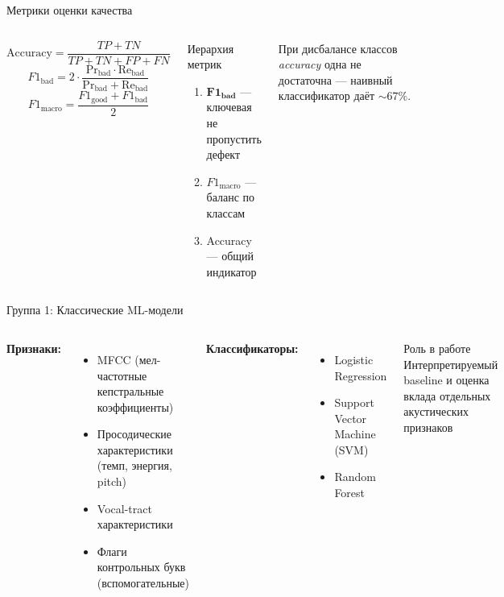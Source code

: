 \documentclass[aspectratio=169]{beamer}
\begin{document}
\begin{frame}{Метрики оценки качества}
  \begin{columns}[T]
      \[
        \text{Accuracy} = \frac{TP + TN}{TP + TN + FP + FN}
      \]
      \[
        F1_{\text{bad}} = 2 \cdot \frac{\text{Pr}_{\text{bad}} \cdot \text{Re}_{\text{bad}}}{\text{Pr}_{\text{bad}} + \text{Re}_{\text{bad}}}
      \]
      \[
        F1_{\text{macro}} = \frac{F1_{\text{good}} + F1_{\text{bad}}}{2}
      \]
      \begin{block}{Иерархия метрик}
        \begin{enumerate}
          \item $\mathbf{F1_{\text{bad}}}$ — ключевая\\
                \small не пропустить дефект
          \item \normalsize $F1_{\text{macro}}$ — баланс по классам
          \item Accuracy — общий индикатор
        \end{enumerate}
      \end{block}
      \vspace{0.5em}
      \small
      При дисбалансе классов \textit{accuracy} одна не достаточна — наивный классификатор даёт ${\sim}67\%$.
  \end{columns}
\end{frame}

\begin{frame}{Группа 1: Классические ML-модели}
  \begin{columns}[T]
      \textbf{Признаки:}
      \begin{itemize}
        \item MFCC (мел-частотные кепстральные коэффициенты)
        \item Просодические характеристики (темп, энергия, pitch)
        \item Vocal-tract характеристики
        \item Флаги контрольных букв (вспомогательные)
      \end{itemize}
      \textbf{Классификаторы:}
      \begin{itemize}
        \item Logistic Regression
        \item Support Vector Machine (SVM)
        \item Random Forest
      \end{itemize}
      \begin{block}{Роль в работе}
        \small Интерпретируемый baseline и оценка вклада отдельных акустических признаков
      \end{block}
  \end{columns}
\end{frame}
\end{document}

